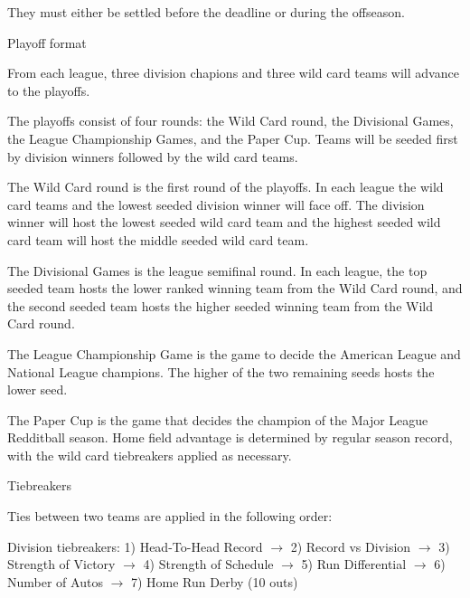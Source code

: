 \begin{deepEnumerate}
\begin{deepEnumerate}
\begin{deepEnumerate}
			 They must either be settled before the deadline or during the offseason.
		\end{deepEnumerate}
		\item Playoff format
		\begin{deepEnumerate}
			\item From each league, three division chapions and three wild card teams will advance to the playoffs.
			\item The playoffs consist of four rounds:
			the Wild Card round, the Divisional Games, the League Championship Games, and the Paper Cup.
			Teams will be seeded first by division winners followed by the wild card teams.
			\begin{deepEnumerate}
				\item The Wild Card round is the first round of the playoffs. 
				In each league the wild card teams and the lowest seeded division winner will face off. 
				The division winner will host the lowest seeded wild card team 
				and the highest seeded wild card team will host the middle seeded wild card team.
				\item The Divisional Games is the league semifinal round. 
				In each league, the top seeded team hosts the lower ranked winning team from the Wild Card round, 
				and the second seeded team hosts the higher seeded winning team from the Wild Card round.
				\item The League Championship Game is the game to decide the American League and National League champions. 
				The higher of the two remaining seeds hosts the lower seed.
				\item The Paper Cup is the game that decides the champion of the Major League Redditball season. 
				Home field advantage is determined by regular season record, 
				with the wild card tiebreakers applied as necessary.
			\end{deepEnumerate}
			\item Tiebreakers
			\begin{deepEnumerate}
				\item Ties between two teams are applied in the following order:
				\begin{deepEnumerate}
					\item Division tiebreakers: 
					1) Head-To-Head Record $\rightarrow$  
					2) Record vs Division $\rightarrow$ 
					3) Strength of Victory $\rightarrow$ 
					4) Strength of Schedule $\rightarrow$ 
					5) Run Differential $\rightarrow$  
					6) Number of Autos $\rightarrow$ 
					7) Home Run Derby (10 outs)

\end{deepEnumerate}
\end{deepEnumerate}
\end{deepEnumerate}
\end{deepEnumerate}
\end{deepEnumerate}

